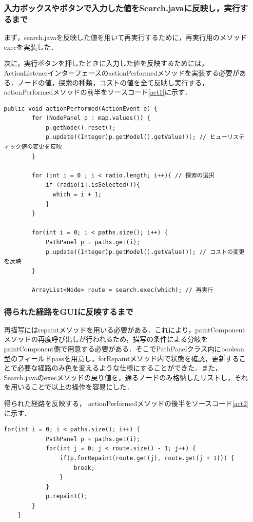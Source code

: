 \documentclass[12pt]{jarticle}
\begin{document}
\subsubsection{入力ボックスやボタンで入力した値をSearch.javaに反映し，実行するまで}
まず，search.javaを反映した値を用いて再実行するために，再実行用のメソッドexecを実装した．

次に，実行ボタンを押したときに入力した値を反映するためには，ActionListenerインターフェースのactionPerformedメソッドを実装する必要がある．ノードの値，探索の種類，コストの値を全て反映し実行する，
actionPerformedメソッドの前半をソースコード\ref{act1}に示す．

\begin{lstlisting}[caption=actionPerformedメソッドの前半, label=act1]
    public void actionPerformed(ActionEvent e) {
        for (NodePanel p : map.values()) {
            p.getNode().reset();
            p.update((Integer)p.getModel().getValue()); // ヒューリスティック値の変更を反映
        }

        for (int i = 0 ; i < radio.length; i++){ // 探索の選択
            if (radio[i].isSelected()){
              which = i + 1;
            }
        }

        for(int i = 0; i < paths.size(); i++) {
            PathPanel p = paths.get(i);
            p.update((Integer)p.getModel().getValue()); // コストの変更を反映
        }
        
        ArrayList<Node> route = search.exec(which); // 再実行
\end{lstlisting}

\subsubsection{得られた経路をGUIに反映するまで}
再描写にはrepaintメソッドを用いる必要がある．これにより，paintComponentメソッドの再度呼び出しが行われるため，描写の条件による分岐をpaintComponent側で用意する必要がある．そこでPathPanelクラス内にboolean型のフィールドpassを用意し，forRepaintメソッド内で状態を確認，更新することで必要な経路のみ色を変えるような仕様にすることができた．また，Search.javaのexecメソッドの戻り値を，通るノードのみ格納したリストし，それを用いることで以上の操作を容易にした．

得られた経路を反映する，
actionPerformedメソッドの後半をソースコード\ref{act2}に示す．

\begin{lstlisting}[caption=actionPerformedメソッドの後半, label=act2]
        for(int i = 0; i < paths.size(); i++) {
            PathPanel p = paths.get(i);
            for(int j = 0; j < route.size() - 1; j++) {
                if(p.forRepaint(route.get(j), route.get(j + 1))) {
                    break;
                }
            }
            p.repaint();
        }
    }
\end{lstlisting}
\end{document}
